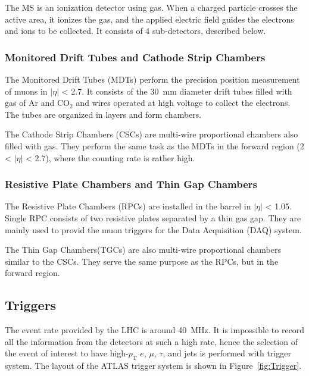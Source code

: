 The MS is an ionization detector using gas. When a charged particle crosses the active area, it ionizes the gas, and the applied electric field guides the electrons and ions to be collected. It consists of 4 sub-detectors, described below.

\subsubsection{Monitored Drift Tubes and Cathode Strip Chambers}
The Monitored Drift Tubes (MDTs) perform the precision position measurement of muons 
in $|\eta|$ < 2.7. It consists of the 30~mm diameter drift tubes filled with gas of Ar and CO$_2$ and wires operated at high voltage to collect the electrons.
The tubes are organized in layers and form chambers.

The Cathode Strip Chambers (CSCs) are multi-wire proportional chambers also filled with gas. They perform the same task as the MDTs in the forward region (2 < $|\eta|$ < 2.7), where the counting rate is rather high. 

\subsubsection{Resistive Plate Chambers and Thin Gap Chambers}
The Resistive Plate Chambers (RPCs) are installed in the barrel in  $|\eta|$ < 1.05. Single RPC consists of two resistive plates separated by a thin gas gap. They are mainly used to  provid the muon triggers for the Data Acquisition (DAQ) system.

The Thin Gap Chambers(TGCs) are also multi-wire proportional chambers similar to the CSCs. They serve the same purpose as the RPCs, but in the forward region. 

\subsection{Triggers}
The event rate provided by the LHC is around 40~MHz. It is impossible to record all the information from the detectors at such a high rate, hence the selection of the event of interest to have high-$p_\mathrm{T}$ $e$, $\mu$, $\tau$, and jets is performed with trigger system. The layout of the ATLAS trigger system is shown in Figure~\ref{fig:Trigger}.

